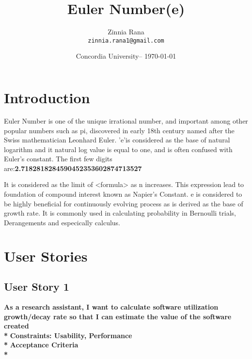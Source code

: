 \documentclass{article}
\title{Euler Number(e)} %
\author{Zinnia Rana\\ \texttt{zinnia.rana1@gmail.com}} %
\date{Concordia University-- \today} %
\begin{document}
\maketitle %


\section*{Introduction} %

Euler Number is one of the unique irrational number, and important among other popular numbers such as pi, discovered in early 18th century  named after the Swiss mathematician Leonhard Euler. 'e'is considered as the base of natural logarithm and it natural log value is equal to one, and is often confused with Euler's constant. The first few digits are:\textbf{2.7182818284590452353602874713527} 


It is considered as the limit of <formula> as n increases. This expression lead to foundation of compound interest known as Napier's Constant. e is considered to be highly beneficial for continuously evolving process as is derived as the base of growth rate. It is commonly used in calculating probability in Bernoulli trials, Derangements and especically calculus.

\section*{User Stories}  %


\subsection{User Story 1} %

\noindent \textbf {As a research assistant, I want to calculate software utilization growth/decay rate so that I can estimate the value of the software created\\*}
\newline 
\noindent \textbf {Constraints:  Usability, Performance\\*}
\newline
\noindent \textbf {Acceptance Criteria\\*}
\begin{flushleft}
\hrulefill
\end{flushleft}
\end{document}
